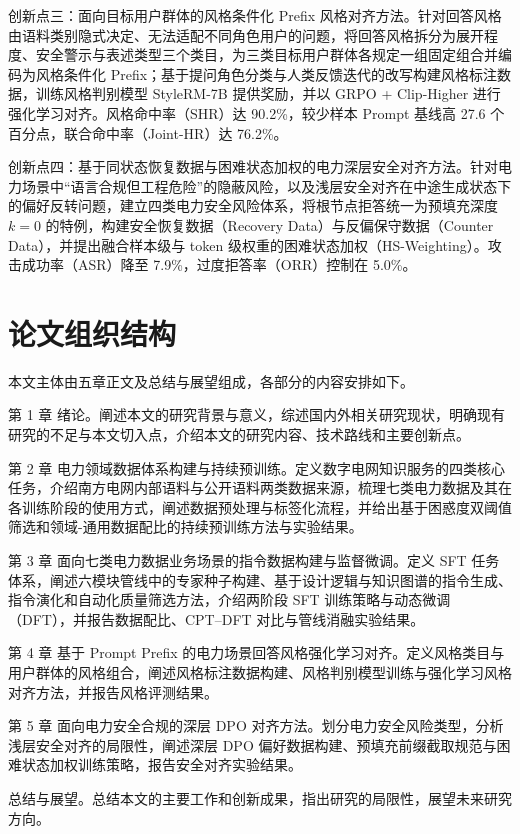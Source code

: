 \documentclass[fontset=fandol,type=master,campus=shenzhen,etitleauto=true]{hithesisbook}
\begin{document}
创新点三：面向目标用户群体的风格条件化 Prefix 风格对齐方法。针对回答风格由语料类别隐式决定、无法适配不同角色用户的问题，将回答风格拆分为展开程度、安全警示与表述类型三个类目，为三类目标用户群体各规定一组固定组合并编码为风格条件化 Prefix；基于提问角色分类与人类反馈迭代的改写构建风格标注数据，训练风格判别模型 StyleRM-7B 提供奖励，并以 GRPO + Clip-Higher 进行强化学习对齐。风格命中率（SHR）达 90.2\%，较少样本 Prompt 基线高 27.6 个百分点，联合命中率（Joint-HR）达 76.2\%。

创新点四：基于同状态恢复数据与困难状态加权的电力深层安全对齐方法。针对电力场景中“语言合规但工程危险”的隐蔽风险，以及浅层安全对齐在中途生成状态下的偏好反转问题，建立四类电力安全风险体系，将根节点拒答统一为预填充深度 $k=0$ 的特例，构建安全恢复数据（Recovery Data）与反偏保守数据（Counter Data），并提出融合样本级与 token 级权重的困难状态加权（HS-Weighting）。攻击成功率（ASR）降至 7.9\%，过度拒答率（ORR）控制在 5.0\%。

\section{论文组织结构}\label{ux8bbaux6587ux7ec4ux7ec7ux7ed3ux6784}

本文主体由五章正文及总结与展望组成，各部分的内容安排如下。

第 1 章 绪论。阐述本文的研究背景与意义，综述国内外相关研究现状，明确现有研究的不足与本文切入点，介绍本文的研究内容、技术路线和主要创新点。

第 2 章 电力领域数据体系构建与持续预训练。定义数字电网知识服务的四类核心任务，介绍南方电网内部语料与公开语料两类数据来源，梳理七类电力数据及其在各训练阶段的使用方式，阐述数据预处理与标签化流程，并给出基于困惑度双阈值筛选和领域-通用数据配比的持续预训练方法与实验结果。

第 3 章 面向七类电力数据业务场景的指令数据构建与监督微调。定义 SFT 任务体系，阐述六模块管线中的专家种子构建、基于设计逻辑与知识图谱的指令生成、指令演化和自动化质量筛选方法，介绍两阶段 SFT 训练策略与动态微调（DFT），并报告数据配比、CPT--DFT 对比与管线消融实验结果。

第 4 章 基于 Prompt Prefix 的电力场景回答风格强化学习对齐。定义风格类目与用户群体的风格组合，阐述风格标注数据构建、风格判别模型训练与强化学习风格对齐方法，并报告风格评测结果。

第 5 章 面向电力安全合规的深层 DPO 对齐方法。划分电力安全风险类型，分析浅层安全对齐的局限性，阐述深层 DPO 偏好数据构建、预填充前缀截取规范与困难状态加权训练策略，报告安全对齐实验结果。

总结与展望。总结本文的主要工作和创新成果，指出研究的局限性，展望未来研究方向。
\end{document}
